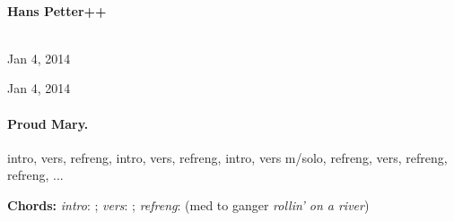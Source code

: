 \documentclass[%
twoside,                 %
draft,                   %
final,                   %
10pt]{article}
\begin{document}
\begin{center}
\ \\ [2mm]


\author{Hans Petter++}

\author{Hans Petter++\inst{}}
\institute{}

\begin{center}
{\bf Hans Petter++${}^{}$} \\ [0mm]
\end{center}

\begin{center}
\end{center}


\date{Jan 4, 2014}
\maketitle
\date{Jan 4, 2014
}

\ \\ [10mm]
{\large\textsf{Jan 4, 2014}}

\end{center}
\vfill
\clearpage

\begin{center}
Jan 4, 2014
\end{center}

\vspace{1cm}



\tableofcontents

\vspace{1cm} %





\paragraph{Proud Mary.}
intro, vers, refreng, intro, vers, refreng, intro, vers m/solo, refreng,
vers, refreng, refreng, ...

\textbf{Chords:} \emph{intro}: ;
\emph{vers}: ; \emph{refreng}:  (med to ganger \emph{rollin' on a river})
\end{document}
